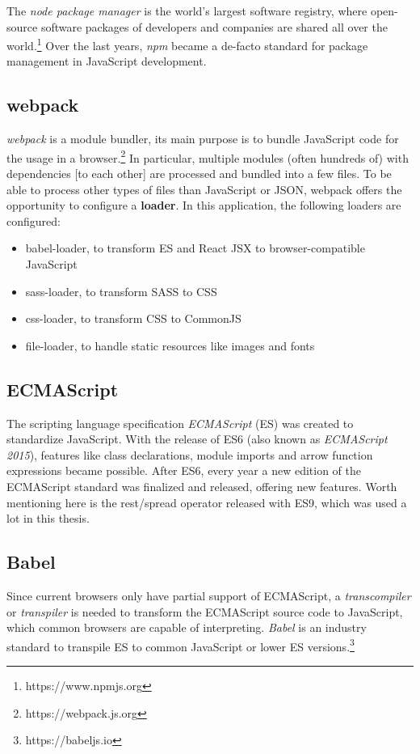 \documentclass[a4paper,top=25mm,bottom=25mm,12pt,pdftex,halfparskip,twoside,bibtotoc,numbers=noenddot]{scrbook}
\begin{document}
The \textit{node package manager} is the world's largest software registry, where open-source software packages of developers and companies are shared all over the world.\footnote{https://www.npmjs.org} Over the last years, \textit{npm} became a de-facto standard for package management in JavaScript development.

\subsection{webpack}

\textit{webpack} is a module bundler, its main purpose is to bundle JavaScript code for the usage in a browser.\footnote{https://webpack.js.org} In particular, multiple modules (often hundreds of) with dependencies [to each other] are processed and bundled into a few files. To be able to process other types of files than JavaScript or JSON, webpack offers the opportunity to configure a \textbf{loader}. In this application, the following loaders are configured:
\begin{itemize}
\item babel-loader, to transform ES and React JSX to browser-compatible JavaScript
\item sass-loader, to transform SASS to CSS
\item css-loader, to transform CSS to CommonJS
\item file-loader, to handle static resources like images and fonts
\end{itemize}

\subsection{ECMAScript}

The scripting language specification \textit{ECMAScript} (ES) was created to standardize JavaScript. With the release of ES6 (also known as \textit{ECMAScript 2015}), features like class declarations, module imports and arrow function expressions became possible. After ES6, every year a new edition of the ECMAScript standard was finalized and released, offering new features. Worth mentioning here is the rest/spread operator released with ES9, which was used a lot in this thesis.

\subsection{Babel}
Since current browsers only have partial support of ECMAScript, a \textit{transcompiler} or \textit{transpiler} is needed to transform the ECMAScript source code to JavaScript, which common browsers are capable of interpreting.
\textit{Babel} is an industry standard to transpile ES to common JavaScript or lower ES versions.\footnote{https://babeljs.io}
\end{document}

